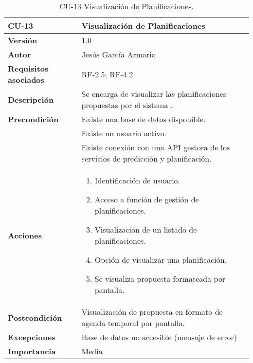 \begin{table}[p]
	\centering
	\begin{tabularx}{\linewidth}{ p{} p{} }
		\toprule
		\textbf{CU-13}    & \textbf{Visualización de Planificaciones}\\
		\toprule
		\textbf{Versión}              & 1.0    \\
		\textbf{Autor}                & Jesús García Armario \\
		\textbf{Requisitos asociados} & RF-2.5; RF-4.2 \\
		\textbf{Descripción}          & Se encarga de visualizar las planificaciones propuestas por el sistema . \\
		\textbf{Precondición}         & Existe una base de datos disponible. \\
  & Existe un usuario activo.\\
  & Existe conexión con una API gestora de los servicios de predicción y planificación.\\
		\textbf{Acciones}             &
		\begin{enumerate}
			\def\labelenumi{\arabic{enumi}.}
			\tightlist
			\item Identificación de usuario.
   \item Acceso a función de gestión de planificaciones.
   \item Visualización de un listado de planificaciones.
   \item Opción de visualizar una planificación.
   \item Se visualiza propuesta formateada por pantalla.
\end{enumerate}\\
		\textbf{Postcondición}        &  Visualización de propuesta en formato de agenda temporal por pantalla.\\
		\textbf{Excepciones}          & Base de datos no accesible (mensaje de error)\\
		\textbf{Importancia}          & Media \\
		\bottomrule
	\end{tabularx}
	\caption{CU-13 Visualización de Planificaciones.}
 \end{table}
 